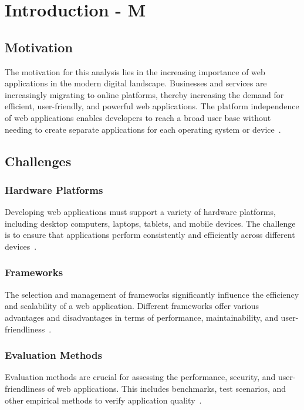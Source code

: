 \chapter{Introduction - M}
\label{cha:Introduction}


\section{Motivation}
The motivation for this analysis lies in the increasing importance of web applications in the modern digital landscape. Businesses and services are increasingly migrating to online platforms, thereby increasing the demand for efficient, user-friendly, and powerful web applications. The platform independence of web applications enables developers to reach a broad user base without needing to create separate applications for each operating system or device~\cite{unctad}.

\section{Challenges}

\subsection{Hardware Platforms}
Developing web applications must support a variety of hardware platforms, including desktop computers, laptops, tablets, and mobile devices. The challenge is to ensure that applications perform consistently and efficiently across different devices~\cite{mao2014developing}.

\subsection{Frameworks}
The selection and management of frameworks significantly influence the efficiency and scalability of a web application. Different frameworks offer various advantages and disadvantages in terms of performance, maintainability, and user-friendliness~\cite{verma2022comparison}.

\subsection{Evaluation Methods}
Evaluation methods are crucial for assessing the performance, security, and user-friendliness of web applications. This includes benchmarks, test scenarios, and other empirical methods to verify application quality~\cite{verma2022comparison}.

